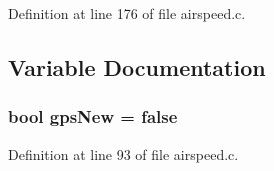 Definition at line 176 of file airspeed.\-c.



\subsection{Variable Documentation}
\hypertarget{group___airspeed_module_ga92e7d8d768e91460a03e1f0ef2c9a443}{
\subsubsection[{gps\-New}]{ {\bf bool} gps\-New = false}}\label{group___airspeed_module_ga92e7d8d768e91460a03e1f0ef2c9a443}


Definition at line 93 of file airspeed.\-c.

